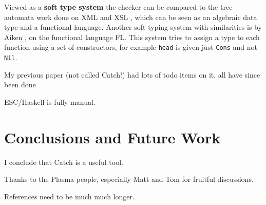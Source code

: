 \documentclass[preprint]{sigplanconf}
\newcommand{\T}[1]{\texttt{#1}}
\begin{document}
Viewed as a \textbf{soft type system} the checker can be compared to the tree automata work done on XML and XSL \cite{static_xslt}, which can be seen as an algebraic data type and a functional language. Another soft typing system with similarities is by Aiken \cite{type:dynamic}, on the functional language FL. This system tries to assign a type to each function using a set of constructors, for example \T{head} is given just \T{Cons} and not \T{Nil}.

My previous paper (not called Catch!) had lots of todo items on it, all have since been done

ESC/Haskell is fully manual.


\section{Conclusions and Future Work}
\label{sec:conclusion}

I conclude that Catch is a useful tool.




%

\acks

Thanks to the Plasma people, especially Matt and Tom for fruitful discussions.

References need to be much much longer.



\end{document}
